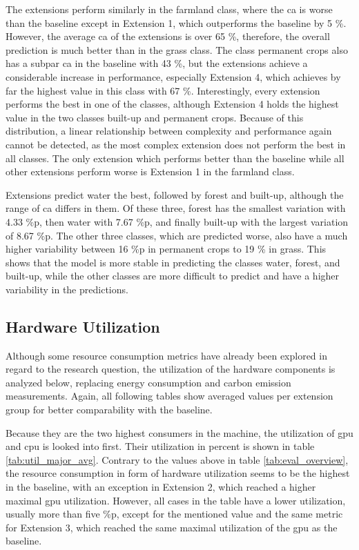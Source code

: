 The extensions perform similarly in the farmland class, where the \gls{ca} is worse than the baseline except in Extension 1, which outperforms the baseline by 5 \%. However, the average \gls{ca} of the extensions is over 65 \%, therefore, the overall prediction is much better than in the grass class. The class permanent crops also has a subpar \gls{ca} in the baseline with 43 \%, but the extensions achieve a considerable increase in performance, especially Extension 4, which achieves by far the highest value in this class with 67 \%. Interestingly, every extension performs the best in one of the classes, although Extension 4 holds the highest value in the two classes built-up and permanent crops. Because of this distribution, a linear relationship between complexity and performance again cannot be detected, as the most complex extension does not perform the best in all classes. The only extension which performs better than the baseline while all other extensions perform worse is Extension 1 in the farmland class.

Extensions predict water the best, followed by forest and built-up, although the range of \gls{ca} differs in them. Of these three, forest has the smallest variation with 4.33 \%p, then water with 7.67 \%p, and finally built-up with the largest variation of 8.67 \%p. The other three classes, which are predicted worse, also have a much higher variability between 16 \%p in permanent crops to 19 \% in grass. This shows that the model is more stable in predicting the classes water, forest, and built-up, while the other classes are more difficult to predict and have a higher variability in the predictions.

\subsection{Hardware Utilization}

Although some resource consumption metrics have already been explored in regard to the research question, the utilization of the hardware components is analyzed below, replacing energy consumption and carbon emission measurements. Again, all following tables show averaged values per extension group for better comparability with the baseline. 

Because they are the two highest consumers in the machine, the utilization of \gls{gpu} and \gls{cpu} is looked into first. Their utilization in percent is shown in table \ref{tab:util_major_avg}. Contrary to the values above in table \ref{tab:eval_overview}, the resource consumption in form of hardware utilization seems to be the highest in the baseline, with an exception in Extension 2, which reached a higher maximal \gls{gpu} utilization. However, all cases in the table have a lower utilization, usually more than five \%p, except for the mentioned value and the same metric for Extension 3, which reached the same maximal utilization of the \gls{gpu} as the baseline.

